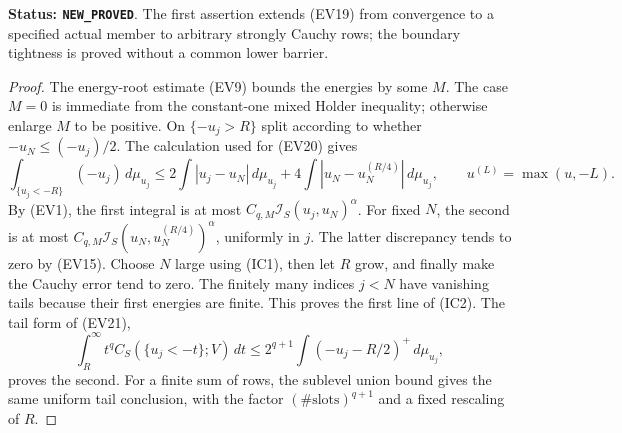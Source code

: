 \noindent\textbf{Status: \texttt{NEW\_PROVED}}. The first assertion
extends (EV19) from convergence to a specified actual member to
arbitrary strongly Cauchy rows; the boundary tightness is proved
without a common lower barrier.

\begin{proof}
The energy-root estimate (EV9) bounds the energies by some $M$.
The case $M=0$ is immediate from the constant-one mixed Holder
inequality; otherwise enlarge $M$ to be positive. On
$\{-u_j>R\}$ split according to whether
$-u_N\leq(-u_j)/2$. The calculation used for (EV20) gives
\[
 \int_{\{u_j<-R\}}(-u_j)\,d\mu_{u_j}
 \leq 2\int|u_j-u_N|\,d\mu_{u_j}
       +4\int|u_N-u_N^{(R/4)}|\,d\mu_{u_j},
 \qquad u^{(L)}=\max(u,-L).
 \tag{IC4}
\]
By (EV1), the first integral is at most
$C_{q,M}\mathscr I_S(u_j,u_N)^\alpha$.
For fixed $N$, the second is at most
$C_{q,M}\mathscr I_S(u_N,u_N^{(R/4)})^\alpha$, uniformly
in $j$. The latter discrepancy tends to zero by (EV15).
Choose $N$ large using (IC1), then let $R$ grow, and finally
make the Cauchy error tend to zero. The finitely many indices
$j<N$ have vanishing tails because their first energies are
finite. This proves the first line of (IC2). The tail form of
(EV21),
\[
 \int_R^\infty t^q C_S(\{u_j<-t\};V)\,dt
       \leq 2^{q+1}\int(-u_j-R/2)^+\,d\mu_{u_j},
 \tag{IC5}
\]
proves the second. For a finite sum of rows, the sublevel union
bound gives the same uniform tail conclusion, with the factor
$(\#\text{slots})^{q+1}$ and a fixed rescaling of $R$.


\end{proof}
